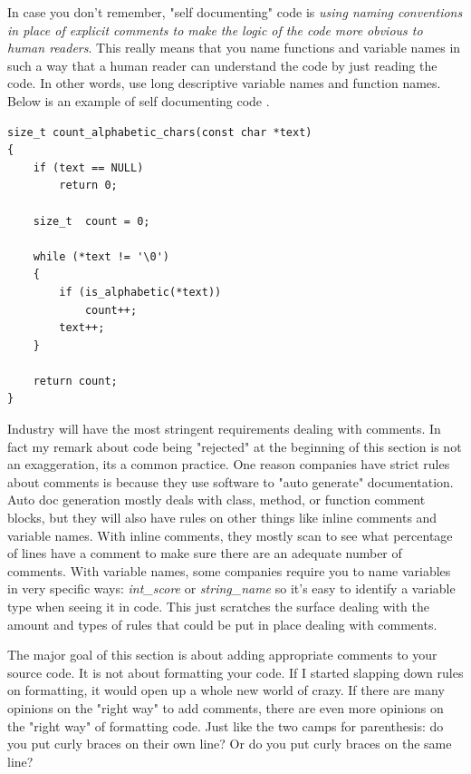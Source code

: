  
 In case you don't remember, "self documenting" code is \textit{using naming conventions in place of explicit comments to make the logic of the code more obvious to human readers}. This really means that you name functions and variable names in such a way that a human reader can understand the code by just reading the code. In other words, use long descriptive variable names and function names. Below is an example of self documenting code \cite{wiki:selfdoc}. 

\begin{verbatim}
size_t count_alphabetic_chars(const char *text)
{
    if (text == NULL)
        return 0;

    size_t  count = 0;

    while (*text != '\0')
    {
        if (is_alphabetic(*text))
            count++;
        text++;
    }

    return count;
}
\end{verbatim}


 Industry will have the most stringent requirements dealing with comments. In fact my remark about code being "rejected" at the beginning of this section is not an exaggeration, its a common practice. One reason companies have strict rules about comments is because they use software to "auto generate" documentation. Auto doc generation mostly deals with class, method, or function comment blocks, but they will also have rules on other things like inline comments and variable names. With inline comments, they mostly scan to see what percentage of lines have a comment to make sure there are an adequate number of comments. With variable names, some companies require you to name variables in very specific ways: \textit{int\_score} or \textit{string\_name} so it's easy to identify a variable type when seeing it in code. This just scratches the surface dealing with the amount and types of rules that could be put in place dealing with comments. 
 
 
 The major goal of this section is about adding appropriate comments to your source code. It is not about formatting your code. If I started slapping down rules on formatting, it would open up a whole new world of crazy. If there are many opinions on the "right way" to add comments, there are even more opinions on the "right way" of formatting code. Just like the two camps for parenthesis: do you put curly braces on their own line? Or do you put curly braces on the same line?\\
 
